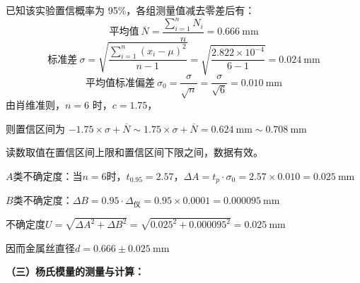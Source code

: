 \documentclass[12pt,a4paper,fontset=windows]{ctexart}
\begin{document}
\vspace{-0.2cm}
已知该实验置信概率为 95\%，各组测量值减去零差后有：
\begin{equation*}
    \text{平均值}\ \overline{N}=\frac{\sum\limits_{i=1}^{n}N_i}{n}=0.666\ \mathrm{mm}
\end{equation*}
\begin{equation*}
    \text{标准差}\ \sigma=\sqrt{\frac{\sum\limits_{i=1}^{n}(x_i-\mu)^{2}}{n-1}}
    =\sqrt{\frac{2.822\times10^{-4}}{6-1}}=0.024\ \mathrm{mm}
\end{equation*}
\begin{equation*}
    \text{平均值标准偏差}\ \sigma_0=\frac{\sigma}{\sqrt{n}}=\frac{\sigma}{\sqrt{6}}=0.010\ \mathrm{mm}
\end{equation*}
由肖维准则，$n=6$ 时，$c=1.75$，

则置信区间为 $-1.75\times\sigma+\overline{N} \sim 1.75\times\sigma+\overline{N} = 0.624\ \mathrm{mm}\sim0.708\ \mathrm{mm}$

读数取值在置信区间上限和置信区间下限之间，数据有效。

\vspace{0.2cm}
$A$类不确定度：当$n=6$时，$t_{0.95}=2.57$，$\Delta A=t_p\cdot\sigma_0=2.57\times0.010=0.025\ \mathrm{mm}$

$B$类不确定度：$\Delta B=0.95\cdot\Delta_{\text{仪}}=0.95\times0.0001=0.000095\ \mathrm{mm}$

不确定度$U=\sqrt{\Delta A^{2}+\Delta B^{2}}=\sqrt{0.025^{2}+0.000095^{2}}=0.025\ \mathrm{mm}$

因而金属丝直径$d=0.666\pm0.025\ \mathrm{mm}$

\vspace{0.6cm}

\noindent\textbf{（三）杨氏模量的测量与计算：}
\end{document}
